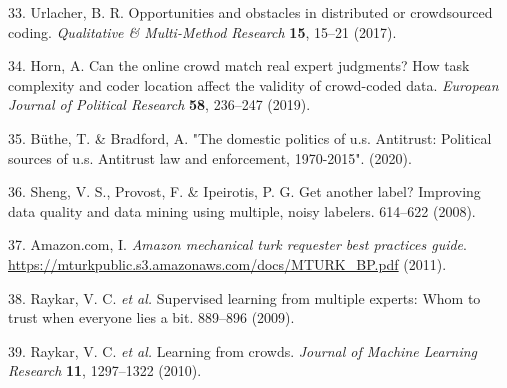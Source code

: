 \documentclass[
]{article}
\newenvironment{cslreferences}%
  {}%
  {\par}
\begin{document}
\begin{cslreferences}
\leavevmode\hypertarget{ref-Urlacher2017}{}%
33. Urlacher, B. R. Opportunities and obstacles in distributed or crowdsourced coding. \emph{Qualitative \& Multi-Method Research} \textbf{15}, 15--21 (2017).

\leavevmode\hypertarget{ref-Horn2019}{}%
34. Horn, A. Can the online crowd match real expert judgments? How task complexity and coder location affect the validity of crowd-coded data. \emph{European Journal of Political Research} \textbf{58}, 236--247 (2019).

\leavevmode\hypertarget{ref-buthe2020}{}%
35. Büthe, T. \& Bradford, A. "The domestic politics of u.s. Antitrust: Political sources of u.s. Antitrust law and enforcement, 1970-2015". (2020).

\leavevmode\hypertarget{ref-Sheng2008}{}%
36. Sheng, V. S., Provost, F. \& Ipeirotis, P. G. Get another label? Improving data quality and data mining using multiple, noisy labelers. 614--622 (2008).

\leavevmode\hypertarget{ref-MTurk2011}{}%
37. Amazon.com, I. \emph{Amazon mechanical turk requester best practices guide}. \url{https://mturkpublic.s3.amazonaws.com/docs/MTURK_BP.pdf} (2011).

\leavevmode\hypertarget{ref-Raykar2009}{}%
38. Raykar, V. C. \emph{et al.} Supervised learning from multiple experts: Whom to trust when everyone lies a bit. 889--896 (2009).

\leavevmode\hypertarget{ref-Raykar2010}{}%
39. Raykar, V. C. \emph{et al.} Learning from crowds. \emph{Journal of Machine Learning Research} \textbf{11}, 1297--1322 (2010).
\end{cslreferences}
\end{document}
